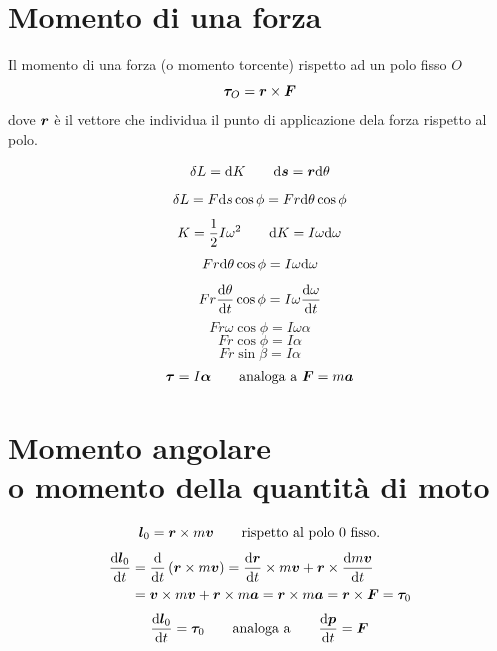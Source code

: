 \section{Momento di una forza}
\begin{Def}
Il momento di una forza (o momento torcente) rispetto ad un polo fisso $O$
 \begin{equation}
  \boldsymbol{\tau}_O=\boldsymbol{r} \times \boldsymbol{F}
 \end{equation}
dove $\boldsymbol{r}$ è il vettore che individua il punto di applicazione dela forza rispetto al polo.
\end{Def}
\begin{equation*}\delta L=\mathrm{d} K\qquad \mathrm{d} \boldsymbol{s}=\boldsymbol{r}\mathrm{d} \theta\end{equation*}
\begin{equation*}\delta L=F\mathrm{d} s\cos \phi=Fr\mathrm{d}\theta\cos\phi\end{equation*}
\begin{equation*}K=\frac{1}{2}I\omega^2\qquad\mathrm{d} K=I\omega\mathrm{d}\omega\end{equation*}
\begin{equation*}Fr\mathrm{d}\theta\cos\phi=I\omega\mathrm{d}\omega\end{equation*}
\[Fr\frac{\mathrm{d}\theta}{\mathrm{d} t}\cos\phi=I\omega\frac{\mathrm{d}\omega}{\mathrm{d}
t}\]
\begin{equation*}Fr\omega\cos\phi=I\omega\alpha\end{equation*}
\begin{equation*}Fr\cos\phi=I\alpha\end{equation*}
\begin{equation*}Fr\sin\beta=I\alpha\end{equation*}
\begin{equation*}\boldsymbol{\tau}=I\boldsymbol{\alpha}\qquad\text{analoga a $\boldsymbol{F}=m\boldsymbol{a}$}\end{equation*}
\section[\index{momento!angolare}\index{momento!della quantità di moto}Momento angolare o della quantità di moto]{Momento angolare\\ o momento della quantità di moto}
\begin{equation*}\boldsymbol{l}_0=\boldsymbol{r}\times m\boldsymbol{v}\qquad\text{rispetto al polo $0$ fisso.}\end{equation*}
\begin{align*}
\frac{\mathrm{d} \boldsymbol{l}_0}{\mathrm{d} t}&=\frac{\mathrm{d}}{\mathrm{d} t}\left(\boldsymbol{r}\times m\boldsymbol{v}\right)= \frac{\mathrm{d}\boldsymbol{r}}{\mathrm{d} t}\times m\boldsymbol{v}+\boldsymbol{r}\times\frac{\mathrm{d} m\boldsymbol{v}}{\mathrm{d} t}\\
&=\boldsymbol{v}\times m\boldsymbol{v}+\boldsymbol{r} \times m\boldsymbol{a}=\boldsymbol{r}\times m\boldsymbol{a}=\boldsymbol{r}\times\boldsymbol{F}=\boldsymbol{\tau}_0
\end{align*}
\[\frac{\mathrm{d}\boldsymbol{l}_0}{\mathrm{d} t}=\boldsymbol{\tau}_0\qquad\text{analoga
a}\qquad\frac{\mathrm{d} \boldsymbol{p}}{\mathrm{d} t}=\boldsymbol{F}\]
